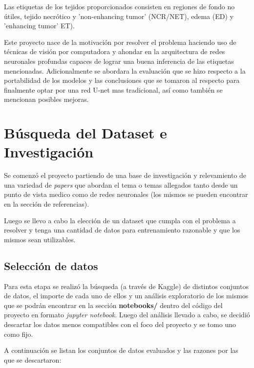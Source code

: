 Las etiquetas de los tejidos proporcionados consisten en regiones de fondo no útiles, tejido necrótico y 'non-enhancing tumor' (NCR/NET), edema (ED) y 'enhancing tumor' ET).

Este proyecto nace de la motivación por resolver el problema haciendo uso de técnicas de visión por computadora y ahondar en la arquitectura de redes neuronales profundas capaces de lograr una buena inferencia de las etiquetas mencionadas.
Adicionalmente se abordara la evaluación que se hizo respecto a la portabilidad de los modelos y las conclusiones que se tomaron al respecto para finalmente optar por una red U-net mas tradicional, así como también se mencionan posibles mejoras.

\section{Búsqueda del Dataset e Investigación}

Se comenzó el proyecto partiendo de una base de investigación y relevamiento de una variedad de \textit{papers} que abordan el tema o temas allegados tanto desde un punto de vista medico como de redes neuronales (los mismos se pueden encontrar en la sección de referencias).

Luego se llevo a cabo la elección de un dataset que cumpla con el problema a resolver y tenga una cantidad de datos para entrenamiento razonable y que los mismos sean utilizables.

\subsection{Selección de datos}

Para esta etapa se realizó la búsqueda (a través de Kaggle) de distintos conjuntos de datos, el importe de cada uno de ellos y un análisis exploratorio de los mismos que se podrán encontrar en la sección \textbf{notebooks/} dentro del código del proyecto en formato \textit{jupyter notebook}. Luego del análisis llevado a cabo, se decidió descartar los datos menos compatibles con el foco del proyecto y se tomo uno como fijo.

A continuación se listan los conjuntos de datos evaluados y las razones por las que se descartaron:

\vspace{0.5cm}

